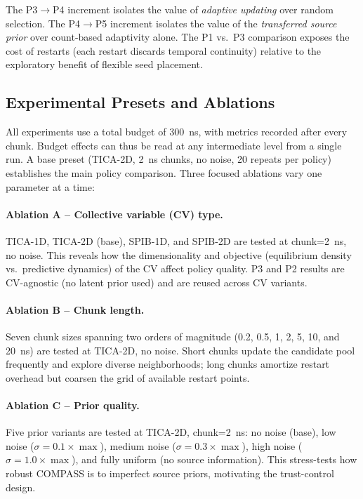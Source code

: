 The P3$\to$P4 increment isolates the value of \emph{adaptive updating} over random selection.
The P4$\to$P5 increment isolates the value of the \emph{transferred source prior} over count-based adaptivity alone.
The P1 vs.\ P3 comparison exposes the cost of restarts (each restart discards temporal continuity) relative to the exploratory benefit of flexible seed placement.

\subsection{Experimental Presets and Ablations}
\label{sec:methods_presets}

All experiments use a total budget of 300~ns, with metrics recorded after every chunk.
Budget effects can thus be read at any intermediate level from a single run.
A base preset (TICA-2D, 2~ns chunks, no noise, 20 repeats per policy) establishes the main policy comparison.
Three focused ablations vary one parameter at a time:

\paragraph{Ablation A -- Collective variable (CV) type.}
TICA-1D, TICA-2D (base), SPIB-1D, and SPIB-2D are tested at chunk=2~ns, no noise.
This reveals how the dimensionality and objective (equilibrium density vs.\ predictive dynamics) of the CV affect policy quality.
P3 and P2 results are CV-agnostic (no latent prior used) and are reused across CV variants.

\paragraph{Ablation B -- Chunk length.}
Seven chunk sizes spanning two orders of magnitude (0.2, 0.5, 1, 2, 5, 10, and 20~ns) are tested at TICA-2D, no noise.
Short chunks update the candidate pool frequently and explore diverse neighborhoods; long chunks amortize restart overhead but coarsen the grid of available restart points.

\paragraph{Ablation C -- Prior quality.}
Five prior variants are tested at TICA-2D, chunk=2~ns: no noise (base), low noise ($\sigma=0.1\times\max$), medium noise ($\sigma=0.3\times\max$), high noise ($\sigma=1.0\times\max$), and fully uniform (no source information).
This stress-tests how robust COMPASS is to imperfect source priors, motivating the trust-control design.

